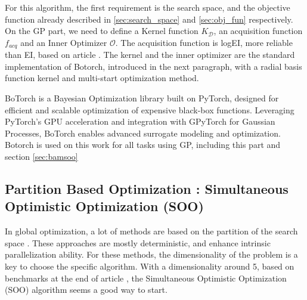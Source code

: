 \documentclass[runningheads]{llncs}
\begin{document}
For this algorithm, the first requirement is the search space, and the objective function already described in \ref{sec:search_space} and \ref{sec:obj_fun} respectively. On the GP part, we need to define a Kernel function $K_\mathcal D$, an acquisition function $f_{acq}$ and an Inner Optimizer $\mathcal O$. The acquisition function is logEI, more reliable than EI, based on article \cite{ament_unexpected_2024}. The kernel and the inner optimizer are the standard implementation of Botorch, introduced in the next paragraph, with a radial basis function kernel and multi-start optimization method. 

BoTorch \cite{balandat_botorch_2020} is a Bayesian Optimization library built on PyTorch, designed for efficient and scalable optimization of expensive black-box functions. Leveraging PyTorch's GPU acceleration and integration with GPyTorch \cite{gardner_gpytorch_2021} for Gaussian Processes, BoTorch enables advanced surrogate modeling and optimization. Botorch is used on this work for all tasks using GP, including this part and section \ref{sec:bamsoo}


\subsection{Partition Based Optimization : Simultaneous Optimistic Optimization (SOO)}
\label{sec:soo}
In global optimization, a lot of methods are based on the partition of the search space \cite{nakib_deterministic_2017,jones_lipschitzian_1993,munos_optimistic_2011}. These approaches are mostly deterministic, and enhance intrinsic parallelization ability. For these methods, the dimensionality of the problem is a key to choose the specific algorithm. With a dimensionality around 5, based on benchmarks at the end of article \cite{firmin_fractal-based_2022}, the Simultaneous Optimistic Optimization (SOO) \cite{munos_optimistic_2011} algorithm seems a good way to start. 
\end{document}
